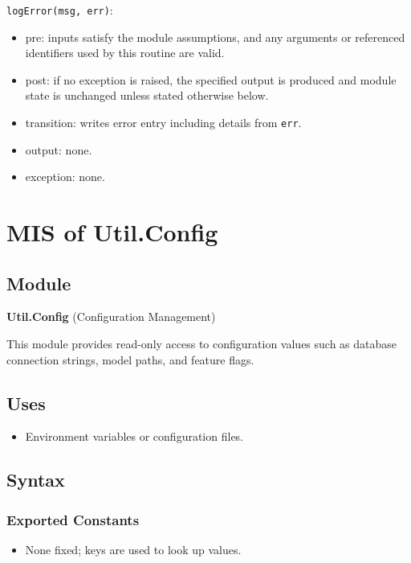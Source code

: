 \documentclass[12pt, titlepage]{article}
\begin{document}
\noindent \texttt{logError(msg, err)}:
\begin{itemize}
    \item pre: inputs satisfy the module assumptions, and any arguments or referenced identifiers used by this routine are valid.
    \item post: if no exception is raised, the specified output is produced and module state is unchanged unless stated otherwise below.
    \item transition: writes error entry including details from \texttt{err}.
    \item output: none.
    \item exception: none.
\end{itemize}



\section{MIS of Util.Config} \label{Util.Config}

\subsection{Module}
\textbf{Util.Config} \; (Configuration Management)

This module provides read-only access to configuration values such as database connection strings, model paths, and feature flags.

\subsection{Uses}
\begin{itemize}
    \item Environment variables or configuration files.
\end{itemize}

\subsection{Syntax}

\subsubsection{Exported Constants}
\begin{itemize}
    \item None fixed; keys are used to look up values.
\end{itemize}
\end{document}
